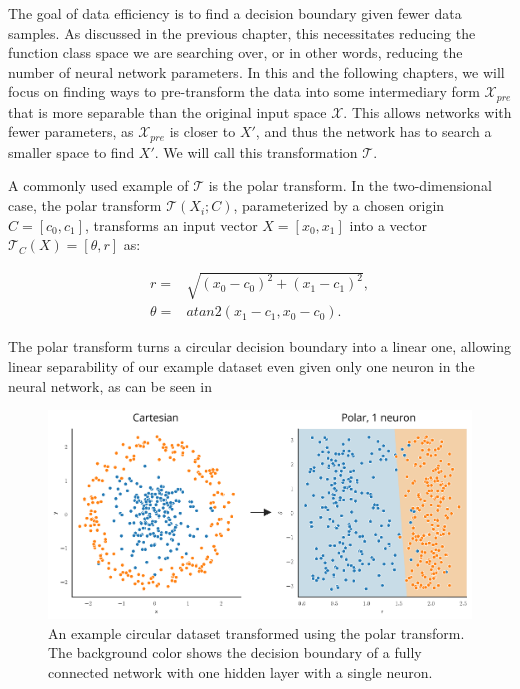 The goal of data efficiency is to find a decision boundary given fewer data samples. As discussed in the previous chapter, this necessitates reducing the function class space we are searching over, or in other words, reducing the number of neural network parameters. In this and the following chapters, we will focus on finding ways to pre-transform the data into some intermediary form $\mathcal{X}_{pre}$ that is more separable than the original input space $\mathcal{X}$. This allows networks with fewer parameters, as $\mathcal{X}_{pre}$ is closer to $X'$, and thus the network has to search a smaller space to find $X'$. We will call this transformation $\mathcal{T}$.

A commonly used example of $\mathcal{T}$ is the polar transform. In the two-dimensional case, the polar transform $\mathcal{T}(X_i; C)$, parameterized by a chosen origin $C = [c_0, c_1]$, transforms an input vector $X = [x_0, x_1]$ into a vector $\mathcal{T}_C(X) = [\theta, r]$ as:

\begin{equation}
    \begin{aligned}
	r =& \sqrt{(x_0 - c_0)^2 + (x_1 - c_1)^2},\\
	\theta =& atan2(x_1 - c_1, x_0 - c_0).
    \end{aligned}
\end{equation}

The polar transform turns a circular decision boundary into a linear one, allowing linear separability of our example dataset even given only one neuron in the neural network, as can be seen in 

	\begin{figure}[h]
		\centering
		\includegraphics[width=0.65\linewidth]{images/4/polar_dataset_neurons}
		\caption{An example circular dataset transformed using the polar transform. The background color shows the decision boundary of a fully connected network with one hidden layer with a single neuron.}
		\label{fig:polar_dataset_neurons}
	\end{figure}

